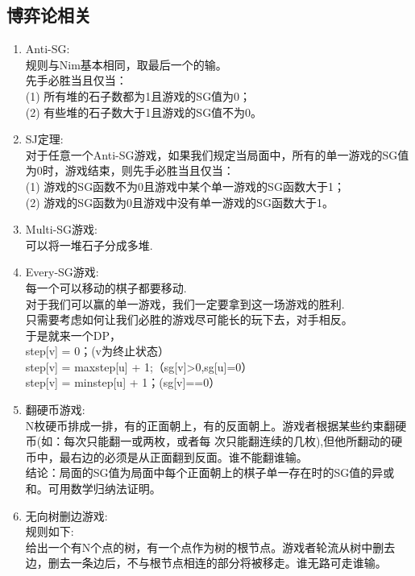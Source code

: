 \documentclass[landscape, twocolumn, 8pt, a4paper, twoside]{extarticle}
\begin{document}
\begin{spacing}{0.1}
\subsection{博弈论相关}
\begin{enumerate}
	\item Anti-SG:\\
		规则与Nim基本相同，取最后一个的输。\\
		先手必胜当且仅当：\\
		(1) 所有堆的石子数都为1且游戏的SG值为0；\\
		(2) 有些堆的石子数大于1且游戏的SG值不为0。\\
	\item SJ定理:\\
		对于任意一个Anti-SG游戏，如果我们规定当局面中，所有的单一游戏的SG值为0时，游戏结束，则先手必胜当且仅当：\\
		(1) 游戏的SG函数不为0且游戏中某个单一游戏的SG函数大于1；\\
		(2) 游戏的SG函数为0且游戏中没有单一游戏的SG函数大于1。\\
	\item Multi-SG游戏:\\
		可以将一堆石子分成多堆.\\
	\item Every-SG游戏:\\
		每一个可以移动的棋子都要移动.\\
		对于我们可以赢的单一游戏，我们一定要拿到这一场游戏的胜利.\\
		只需要考虑如何让我们必胜的游戏尽可能长的玩下去，对手相反。\\
		于是就来一个DP，\\
		step[v] = 0；(v为终止状态）\\
		step[v] = max{step[u]} + 1;（sg[v]>0,sg[u]=0）\\
		step[v] = min{step[u]} + 1；(sg[v]==0）\\
	\item 翻硬币游戏:\\
		N枚硬币排成一排，有的正面朝上，有的反面朝上。游戏者根据某些约束翻硬币(如：每次只能翻一或两枚，或者每 次只能翻连续的几枚),但他所翻动的硬币中，最右边的必须是从正面翻到反面。谁不能翻谁输。\\
		结论：局面的SG值为局面中每个正面朝上的棋子单一存在时的SG值的异或和。可用数学归纳法证明。\\
	\item 无向树删边游戏:\\
		规则如下:\\
		给出一个有N个点的树，有一个点作为树的根节点。游戏者轮流从树中删去边，删去一条边后，不与根节点相连的部分将被移走。谁无路可走谁输。\\

\end{enumerate}
\end{spacing}
\end{document}

